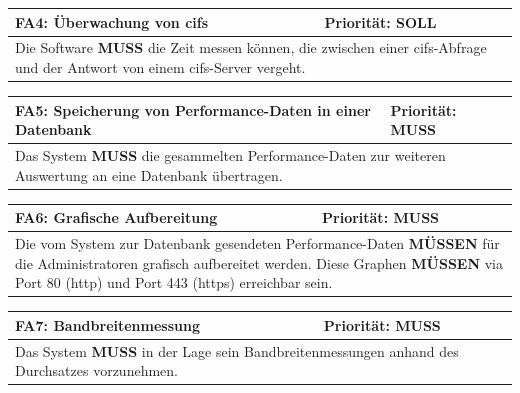 \documentclass[titlepage]{report}
\begin{document}
\begin{center}
\begin{tabular}{p{}>{\raggedleft\arraybackslash}p{}}\toprule
    \textbf{FA4: Überwachung von \gls{cifs} } & \textbf{Priorität: SOLL} \\\midrule
	\multicolumn{2}{p{\textwidth-\tabcolsep}}{%
    Die Software \textbf{MUSS} die Zeit messen können, die
    zwischen einer \gls{cifs}-Abfrage und der Antwort von einem
    \gls{cifs}-Server vergeht.}\\\bottomrule
\end{tabular}
    \label{table:FA4}
\end{center}
\begin{center}
\begin{tabular}{p{}>{\raggedleft\arraybackslash}p{}}\toprule
    \textbf{FA5: Speicherung von Performance-Daten in einer Datenbank } & \textbf{Priorität: MUSS} \\\midrule
	\multicolumn{2}{p{\textwidth-\tabcolsep}}{%
        Das System \textbf{MUSS} die gesammelten Performance-Daten
        zur weiteren Auswertung an eine Datenbank übertragen.}\\\bottomrule
\end{tabular}
    \label{table:FA5}
\end{center}
\begin{center}
\begin{tabular}{p{}>{\raggedleft\arraybackslash}p{}}\toprule
    \textbf{FA6: Grafische Aufbereitung } & \textbf{Priorität: MUSS} \\\midrule
	\multicolumn{2}{p{\textwidth-\tabcolsep}}{%
        Die vom System zur Datenbank gesendeten Performance-Daten
        \textbf{MÜSSEN} für die Administratoren grafisch
        aufbereitet werden.
        Diese Graphen \textbf{MÜSSEN} via Port 80 (\gls{http})
        und Port 443 (\gls{https}) erreichbar sein.
        }\\\bottomrule
\end{tabular}
    \label{table:FA6}
\end{center}
\begin{center}
\begin{tabular}{p{}>{\raggedleft\arraybackslash}p{}}\toprule
    \textbf{FA7: Bandbreitenmessung } & \textbf{Priorität: MUSS} \\\midrule
	\multicolumn{2}{p{\textwidth-\tabcolsep}}{%
        Das System \textbf{MUSS} in der Lage sein Bandbreitenmessungen anhand des
        Durchsatzes vorzunehmen.
                }\\\bottomrule
\end{tabular}
    \label{table:FA7}
\end{center}
\end{document}
